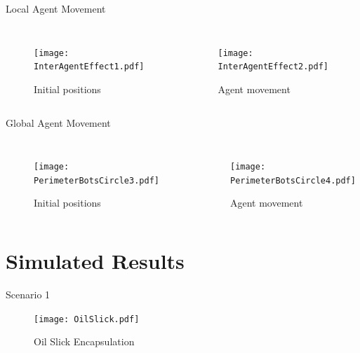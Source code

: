 \documentclass{beamer}
\begin{document}
\begin{frame}{Local Agent Movement}
  \begin{columns}
      \begin{figure}
        \begin{center}
          \texttt{[image: InterAgentEffect1.pdf]}
        \end{center}
        \caption{Initial positions}
      \end{figure}
        \begin{figure}
          \begin{center}
            \texttt{[image: InterAgentEffect2.pdf]}
          \end{center}
          \caption{Agent movement}
        \end{figure}
    \end{columns}
\end{frame}

\begin{frame}{Global Agent Movement}
  \begin{columns}
      \begin{figure}
        \begin{center}
          \texttt{[image: PerimeterBotsCircle3.pdf]}
        \end{center}
        \caption{Initial positions}
      \end{figure}
        \begin{figure}
          \begin{center}
            \texttt{[image: PerimeterBotsCircle4.pdf]}
          \end{center}
          \caption{Agent movement}
        \end{figure}
    \end{columns}
\end{frame}  

\section{Simulated Results}
\begin{frame}{Scenario 1}
  \begin{center}
    \begin{figure}
      \begin{center}
        \texttt{[image: OilSlick.pdf]}
      \end{center}
      \caption{Oil Slick Encapsulation}
    \end{figure}
  \end{center}
\end{frame}  
\end{document}
